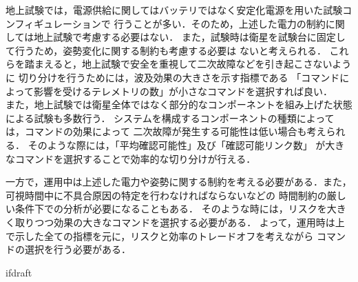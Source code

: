 \documentclass[11pt]{jsreport}
\begin{document}
地上試験では，電源供給に関してはバッテリではなく安定化電源を用いた試験コンフィギュレーションで
行うことが多い．そのため，上述した電力の制約に関しては地上試験で考慮する必要はない．
また，試験時は衛星を試験台に固定して行うため，姿勢変化に関する制約も考慮する必要は
ないと考えられる．
これらを踏まえると，地上試験で安全を重視して二次故障などを引き起こさないように
切り分けを行うためには，波及効果の大きさを示す指標である
「コマンドによって影響を受けるテレメトリの数」が小さなコマンドを選択すれば良い．\\
また，地上試験では衛星全体ではなく部分的なコンポーネントを組み上げた状態による試験も多数行う．
システムを構成するコンポーネントの種類によっては，コマンドの効果によって
二次故障が発生する可能性は低い場合も考えられる．
そのような際には，「平均確認可能性」及び「確認可能リンク数」
が大きなコマンドを選択することで効率的な切り分けが行える．

一方で，運用中は上述した電力や姿勢に関する制約を考える必要がある．また，
可視時間中に不具合原因の特定を行わなければならないなどの
時間制約の厳しい条件下での分析が必要になることもある．
そのような時には，リスクを大きく取りつつ効果の大きなコマンドを選択する必要がある．
よって，運用時は上で示した全ての指標を元に，リスクと効率のトレードオフを考えながら
コマンドの選択を行う必要がある．

\expandafter\ifx\csname ifdraft\endcsname\relax
  
\end{document}
